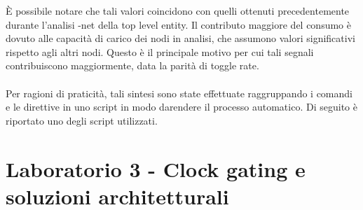 \documentclass[11pt,  english, makeidx, a4paper, titlepage, oneside]{book}
\newenvironment{listato}{\footnotesize} {\normalsize }
\begin{document}
\vspace{0.3cm}
È possibile notare che tali valori coincidono con quelli ottenuti precedentemente durante l'analisi -net della top level entity. Il contributo maggiore del consumo è dovuto alle capacità di carico dei nodi in analisi, che assumono  valori significativi rispetto agli altri nodi. Questo è il principale motivo per cui tali segnali contribuiscono maggiormente, data la parità di toggle rate.
\\\\
Per ragioni di praticità, tali sintesi sono state effettuate raggruppando i comandi e le direttive in uno script in modo darendere il processo automatico. Di seguito è riportato uno degli script utilizzati.
\begin{center}
\begin{listato}
	\centerline{}
\end{listato}
\end{center}

\chapter{Laboratorio 3 - Clock gating e soluzioni architetturali}
\end{document}
